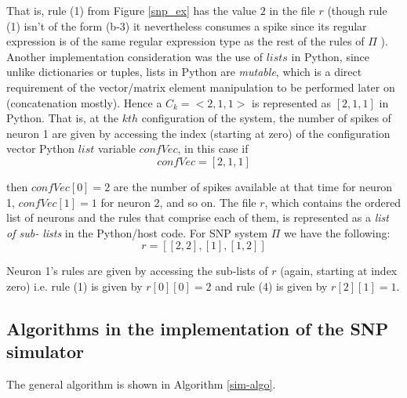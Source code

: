 \documentclass{acm_proc_article-sp}
\begin{document}
That is, rule (1) from Figure \ref{snp_ex} has the value $2$ in the file $r$ (though rule (1)
isn't of the form (b-3) it nevertheless consumes a spike since
its regular expression is of the same regular expression type
as the rest of the rules of ${\Pi}$ ). Another implementation
consideration was the use of $lists$ in Python, since unlike
dictionaries or tuples, lists in Python are  \emph{mutable}, which is a
direct requirement of the vector/matrix element
manipulation to be performed later on (concatenation
mostly). Hence a $C_k = <2, 1, 1>$ is
represented as $[ 2, 1, 1 ]$ in Python. That is, at the $kth$
configuration of the system, the number of spikes of neuron
1 are given by accessing the index (starting at zero) of the
configuration vector Python $list$ variable $confVec$, in this case if
\begin{equation}\label{confvec}
confVec = [ 2, 1, 1 ]
\end{equation}
	
then $confVec[ 0 ] = 2$ are the number of spikes available at
that time for neuron 1, $confVec[ 1 ] = 1$ for neuron 2, and so
on. The file $r$, which contains the ordered list of neurons and
the rules that comprise each of them, is represented as a \textit{list of sub-
lists} in the Python/host code. For SNP system ${\Pi}$ we have the
following:
\begin{equation}\label{rule-list}
r = [ [ 2, 2 ], [ 1 ], [ 1, 2 ] ]
\end{equation}

Neuron 1's rules are given by accessing the sub-lists of $r$
(again, starting at index zero) i.e. rule (1) is given by $r[ 0 ][ 0 ]
= 2$ and rule (4) is given by $r[ 2 ][ 1 ] = 1$.

\subsection{Algorithms in the implementation of the SNP
simulator}\label{snp-sim-algo}
	
The general algorithm is shown in Algorithm \ref{sim-algo}.
	
\end{document}
